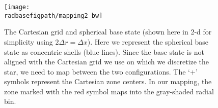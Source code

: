 \clearpage

\begin{figure}[tpb]
\begin{center}
\texttt{[image: \\radbasefigpath/mapping2\_bw]}
\caption{\label{fig:mapping} The Cartesian grid and spherical base
state (shown here in 2-d for simplicity using $2 \Delta r = \Delta x$).
Here we represent the
spherical base state as concentric shells (blue lines).  Since the
base state is not aligned with the Cartesian grid we use on which
we discretize the star, we need to map between the two configurations.
The `$+$' symbols represent the Cartesian zone centers.  In our
mapping, the zone marked with the red symbol maps into the gray-shaded
radial bin. }
\label{fig:mapping}
\end{center}
\end{figure}
